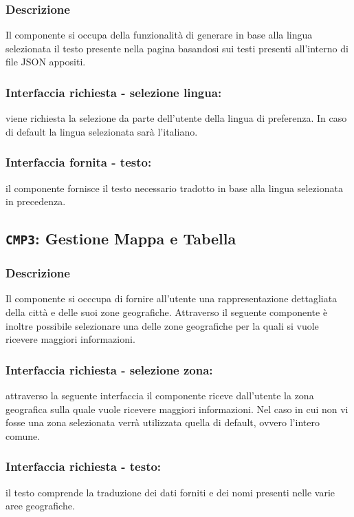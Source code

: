        \subsubsection{Descrizione} 
            Il componente si occupa della funzionalità di generare in base alla lingua selezionata il testo presente nella pagina basandosi sui testi presenti all'interno di file JSON appositi.
        \subsubsection{Interfaccia richiesta - selezione lingua:}
            viene richiesta la selezione da parte dell'utente della lingua di preferenza.
            In caso di default la lingua selezionata sarà l'italiano.
        \subsubsection{Interfaccia fornita - testo:}
            il componente fornisce il testo necessario tradotto in base alla lingua selezionata in precedenza.

    \subsection{\texttt{CMP3}: Gestione Mappa e Tabella}
        \subsubsection{Descrizione}
            Il componente si occcupa di fornire all'utente una rappresentazione dettagliata della città e delle suoi zone geografiche. Attraverso il seguente componente è inoltre possibile selezionare una delle zone geografiche per la quali si vuole ricevere maggiori informazioni. 
        \subsubsection{Interfaccia richiesta - selezione zona:}
            attraverso la seguente interfaccia il componente riceve dall'utente la zona geografica sulla quale vuole ricevere maggiori informazioni. Nel caso in cui non vi fosse una zona selezionata verrà utilizzata quella di default, ovvero l'intero comune.
        \subsubsection{Interfaccia richiesta - testo:}
            il testo comprende la traduzione dei dati forniti e dei nomi presenti nelle varie aree geografiche.
